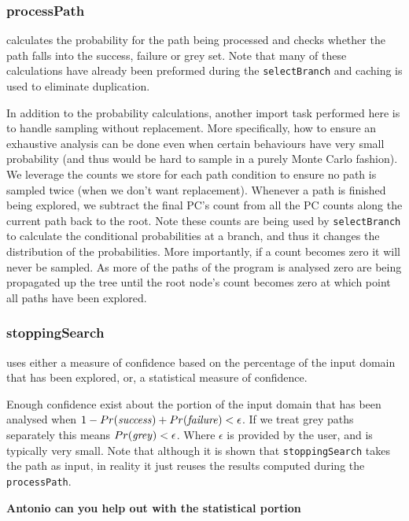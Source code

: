 \subsubsection{processPath} calculates the probability for the path being processed and checks whether the path falls into the success, failure or grey set. Note that many of these calculations have already been preformed during the {\tt selectBranch} and caching is used to eliminate duplication. 

In addition to the probability calculations, another import task performed here is to handle sampling without replacement. More specifically, how to ensure an exhaustive analysis can be done even when certain behaviours have very small probability (and thus would be hard to sample in a purely Monte Carlo fashion). We leverage the counts we store for each path condition to ensure no path is sampled twice (when we don't want replacement). Whenever a path is finished being explored, we subtract the final PC's count from all the PC counts along the current path back to the root. Note these counts are being used by {\tt selectBranch} to calculate the conditional probabilities at a branch, and thus it changes the distribution of the probabilities. More importantly, if a count becomes zero it will never be sampled. As more of the paths of the program is analysed zero are being propagated up the tree until the root node's count becomes zero at which point all paths have been explored. 

\subsubsection{stoppingSearch} uses either a measure of confidence based on the percentage of the input domain that has been explored, or, a statistical measure of confidence. 

Enough confidence exist about the portion of the input domain that has been analysed when  $1 - Pr(\mathit{success}) + Pr(\mathit{failure}) < \epsilon$.  If we treat grey paths separately this means $Pr(\mathit{grey}) < \epsilon$. Where $\epsilon$ is provided by the user, and is typically very small. Note that although it is shown that {\tt stoppingSearch} takes the path as input, in reality it just reuses the results computed during the {\tt processPath}. 

{\bf Antonio can you help out with the statistical portion}



